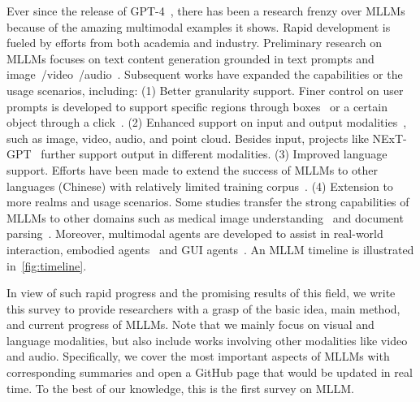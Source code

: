 Ever since the release of GPT-4~\cite{openai2023gpt4}, there has been a research frenzy over MLLMs because of the amazing multimodal examples it shows. 
Rapid development is fueled by efforts from both academia and industry. 
Preliminary research on MLLMs focuses on text content generation grounded in text prompts and image~\cite{llava,awadalla2023openflamingo}/video~\cite{videochat,video-llama}/audio~\cite{deshmukh2024pengi}.
Subsequent works have expanded the capabilities or the usage scenarios, including: 
(1) Better granularity support. Finer control on user prompts is developed to support specific regions through boxes~\cite{chen2023shikra} or a certain object through a click~\cite{yuan2023osprey}. 
(2) Enhanced support on input and output modalities~\cite{han2023imagebind, moon2023anymal}, such as image, video, audio, and point cloud. 
Besides input, projects like NExT-GPT~\cite{wu2023next} further support output in different modalities. 
(3) Improved language support. Efforts have been made to extend the success of MLLMs to other languages (\eg Chinese) with relatively limited training corpus~\cite{hu2023large, bai2023qwen}. 
(4) Extension to more realms and usage scenarios. Some studies transfer the strong capabilities of MLLMs to other domains such as medical image understanding~\cite{llava-med,moor2023med,pmc-vqa} and document parsing~\cite{ye2023mplug,liu2024textmonkey,hu2023mplug}. Moreover, multimodal agents are developed to assist in real-world interaction, \eg embodied agents~\cite{huang2023embodied,peng2023kosmos} and GUI agents~\cite{yang2023appagent,hong2023cogagent, wang2024mobile}. An MLLM timeline is illustrated in~\cref{fig:timeline}.

In view of such rapid progress and the promising results of this field, we write this survey to provide researchers with a grasp of the basic idea, main method, and current progress of MLLMs. Note that we mainly focus on visual and language modalities, but also include works involving other modalities like video and audio. 
Specifically, we cover the most important aspects of MLLMs with corresponding summaries and open a GitHub page that would be updated in real time. 
To the best of our knowledge, this is the first survey on MLLM.





